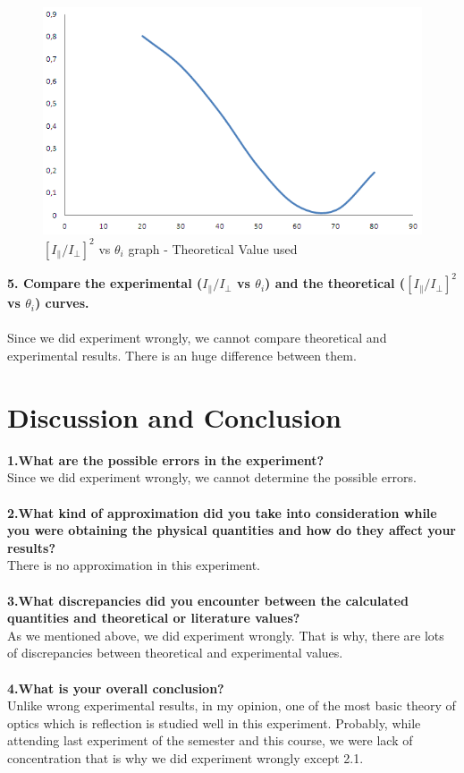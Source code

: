 \documentclass[a4paper,12pt]{report}
\begin{document}
\begin{figure}[h!]
\centering
\includegraphics[width=1.0\linewidth, height=0.4\textheight]{g4}
\caption{$[I_{\parallel}/I_{\perp}]^{2}$ vs $\theta_{i}$ graph - Theoretical Value used}
\label{fig:g4}
\end{figure}
\textbf{5. Compare the experimental ($I_{\parallel}/I_{\perp}$ vs $\theta_{i}$) and the theoretical ($[I_{\parallel}/I_{\perp}]^{2}$ vs $\theta_{i}$) curves.}\\\\
Since we did experiment wrongly, we cannot compare theoretical and experimental results. There is an huge difference between them. 







\chapter{Discussion and Conclusion}
\textbf{1.What are the possible errors in the experiment?}\\
Since we did experiment wrongly, we cannot determine the possible errors.\\\\
\textbf{2.What kind of approximation did you take into consideration while you were obtaining the physical quantities and how do they affect your results?}\\
There is no approximation in this experiment.\\\\
\textbf{3.What discrepancies did you encounter between the calculated quantities and theoretical or literature values?}\\
As we mentioned above, we did experiment wrongly. That is why, there are lots of discrepancies between theoretical and experimental values.\\\\
\textbf{4.What is your overall conclusion?}\\
Unlike wrong experimental results, in my opinion, one of the most basic theory of optics which is reflection is studied well in this experiment. Probably, while attending last experiment of the semester and this course, we were lack of concentration that is why we did experiment wrongly except 2.1.
\end{document}
